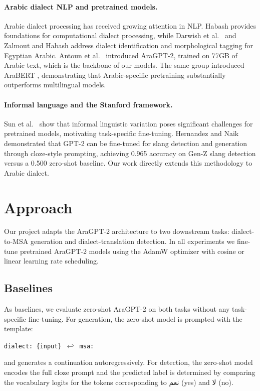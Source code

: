 \documentclass[11pt]{article}
\newcommand{\arb}[1]{{\arabicfont\beginR #1\endR}}
\begin{document}
\paragraph{Arabic dialect NLP and pretrained models.}
Arabic dialect processing has received growing attention in NLP. Habash \cite{habash2010} provides foundations for computational dialect processing, while Darwish et al.\ \cite{darwish2021} and Zalmout and Habash \cite{zalmout2017} address dialect identification and morphological tagging for Egyptian Arabic. Antoun et al.\ \cite{antoun2021} introduced AraGPT-2, trained on 77GB of Arabic text, which is the backbone of our models. The same group introduced AraBERT \cite{antoun2020}, demonstrating that Arabic-specific pretraining substantially outperforms multilingual models.

\paragraph{Informal language and the Stanford framework.}
Sun et al.\ \cite{sun2024} show that informal linguistic variation poses significant challenges for pretrained models, motivating task-specific fine-tuning. Hernandez and Naik \cite{hernandez2025} demonstrated that GPT-2 can be fine-tuned for slang detection and generation through cloze-style prompting, achieving 0.965 accuracy on Gen-Z slang detection versus a 0.500 zero-shot baseline. Our work directly extends this methodology to Arabic dialect.
\section{Approach}

Our project adapts the AraGPT-2 architecture to two downstream tasks: dialect-to-MSA generation and dialect-translation detection. In all experiments we fine-tune pretrained AraGPT-2 models using the AdamW optimizer with cosine or linear learning rate scheduling.

\subsection{Baselines}

As baselines, we evaluate zero-shot AraGPT-2 on both tasks without any task-specific fine-tuning. For generation, the zero-shot model is prompted with the template:

\begin{center}
\texttt{dialect: \{input\} $\hookleftarrow$ msa:}
\end{center}
and generates a continuation autoregressively. For detection, the zero-shot model encodes the full cloze prompt and the predicted label is determined by comparing the vocabulary logits for the tokens corresponding to \arb{نعم} (yes) and \arb{لا} (no).
\end{document}
